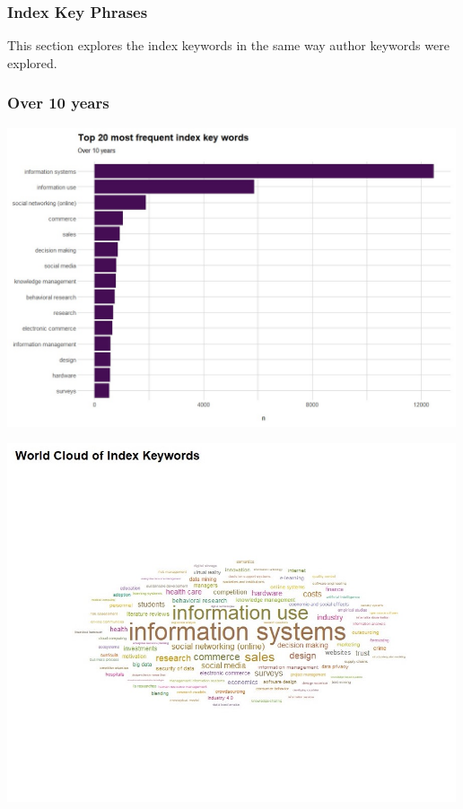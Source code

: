 \documentclass[
  letterpaper,
  DIV=11,
  numbers=noendperiod]{scrartcl}
\begin{document}
\hypertarget{index-key-phrases}{%
\subsubsection{Index Key Phrases}\label{index-key-phrases}}

This section explores the index keywords in the same way author keywords
were explored.

\hypertarget{over-10-years-1}{%
\subsubsection{Over 10 years}\label{over-10-years-1}}

\includegraphics[width=5.20833in,height=\textheight]{images/Indextop20mostfreqkeywords.jpg}

\includegraphics[width=5.20833in,height=\textheight]{images/Indextop20mostfreqkeywordsWordCloud.jpg}
\end{document}
